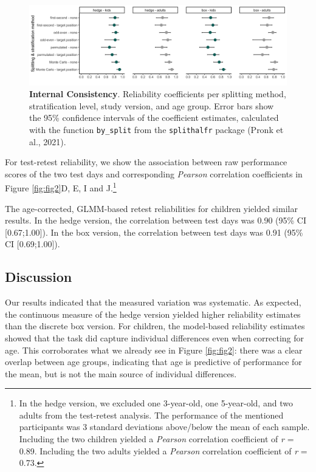 \documentclass[
  man,floatsintext]{apa6}
\begin{document}
\begin{figure}

{\centering \includegraphics[width=1\linewidth]{../figures/gafo_splithalf} 

}

\caption{\textbf{Internal Consistency}. Reliability coefficients per splitting method, stratification level, study version, and age group. Error bars show the 95\% confidence intervals of the coefficient estimates, calculated with the function \texttt{by\_split} from the \texttt{splithalfr} package (Pronk et al., 2021).}\label{fig:fig3}
\end{figure}

For test-retest reliability, we show the association between raw performance scores of the two test days and corresponding \emph{Pearson} correlation coefficients in Figure \ref{fig:fig2}D, E, I and J.\footnote{In the hedge version, we excluded one 3-year-old, one 5-year-old, and two adults from the test-retest analysis.
  The performance of the mentioned participants was 3 standard deviations above/below the mean of each sample.
  Including the two children yielded a \emph{Pearson} correlation coefficient of \emph{r} = 0.89.
  Including the two adults yielded a \emph{Pearson} correlation coefficient of \emph{r} = 0.73.}

The age-corrected, GLMM-based retest reliabilities for children yielded similar results.
In the hedge version, the correlation between test days was 0.90 (95\% CI {[}0.67;1.00{]}).
In the box version, the correlation between test days was 0.91 (95\% CI {[}0.69;1.00{]}).

\hypertarget{discussion-1}{%
\subsection{Discussion}\label{discussion-1}}

Our results indicated that the measured variation was systematic.
As expected, the continuous measure of the hedge version yielded higher reliability estimates than the discrete box version.
For children, the model-based reliability estimates showed that the task did capture individual differences even when correcting for age.
This corroborates what we already see in Figure \ref{fig:fig2}: there was a clear overlap between age groups, indicating that age is predictive of performance for the mean, but is not the main source of individual differences.
\end{document}
